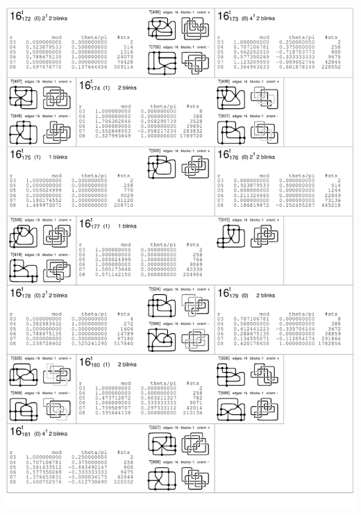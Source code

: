 \begin{center}
 \includegraphics[height=23.5cm]{E.figsbw2/con3catalog032_bw.pdf} \eject  

\end{center}
